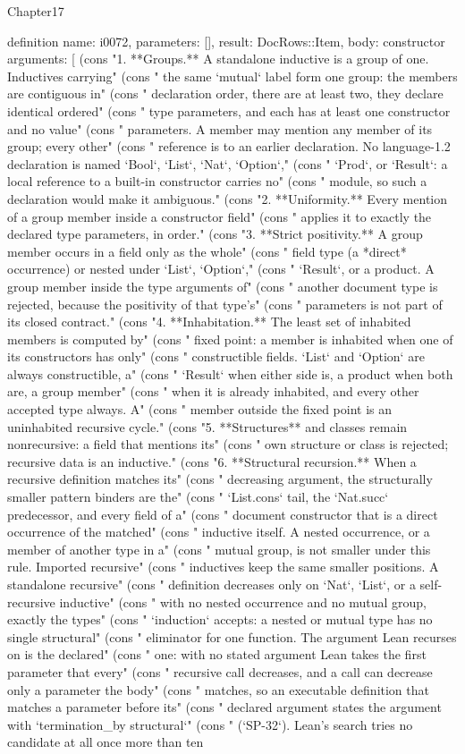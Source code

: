 \begin{lexlean}{Chapter17}
\begin{semanticmodule}
definition{
  name: i0072,
  parameters: [],
  result: DocRows::Item,
  body: constructor{
    arguments: [
      (cons "1. **Groups.** A standalone inductive is a group of one. Inductives carrying" (cons "   the same `mutual` label form one group: the members are contiguous in" (cons "   declaration order, there are at least two, they declare identical ordered" (cons "   type parameters, and each has at least one constructor and no value" (cons "   parameters. A member may mention any member of its group; every other" (cons "   reference is to an earlier declaration. No language-1.2 declaration is named `Bool`, `List`, `Nat`, `Option`," (cons "   `Prod`, or `Result`: a local reference to a built-in constructor carries no" (cons "   module, so such a declaration would make it ambiguous." (cons "2. **Uniformity.** Every mention of a group member inside a constructor field" (cons "   applies it to exactly the declared type parameters, in order." (cons "3. **Strict positivity.** A group member occurs in a field only as the whole" (cons "   field type (a *direct* occurrence) or nested under `List`, `Option`," (cons "   `Result`, or a product. A group member inside the type arguments of" (cons "   another document type is rejected, because the positivity of that type's" (cons "   parameters is not part of its closed contract." (cons "4. **Inhabitation.** The least set of inhabited members is computed by" (cons "   fixed point: a member is inhabited when one of its constructors has only" (cons "   constructible fields. `List` and `Option` are always constructible, a" (cons "   `Result` when either side is, a product when both are, a group member" (cons "   when it is already inhabited, and every other accepted type always. A" (cons "   member outside the fixed point is an uninhabited recursive cycle." (cons "5. **Structures** and classes remain nonrecursive: a field that mentions its" (cons "   own structure or class is rejected; recursive data is an inductive." (cons "6. **Structural recursion.** When a recursive definition matches its" (cons "   decreasing argument, the structurally smaller pattern binders are the" (cons "   `List.cons` tail, the `Nat.succ` predecessor, and every field of a" (cons "   document constructor that is a direct occurrence of the matched" (cons "   inductive itself. A nested occurrence, or a member of another type in a" (cons "   mutual group, is not smaller under this rule. Imported recursive" (cons "   inductives keep the same smaller positions. A standalone recursive" (cons "   definition decreases only on `Nat`, `List`, or a self-recursive inductive" (cons "   with no nested occurrence and no mutual group, exactly the types" (cons "   `induction` accepts: a nested or mutual type has no single structural" (cons "   eliminator for one function. The argument Lean recurses on is the declared" (cons "   one: with no stated argument Lean takes the first parameter that every" (cons "   recursive call decreases, and a call can decrease only a parameter the body" (cons "   matches, so an executable definition that matches a parameter before its" (cons "   declared argument states the argument with `termination_by structural`" (cons "   (`SP-32`). Lean's search tries no candidate at all once more than ten }}
\end{semanticmodule}
\end{lexlean}
